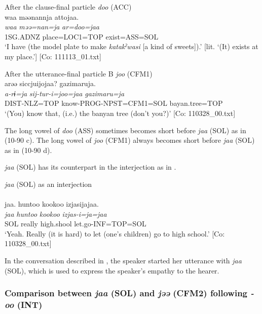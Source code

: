\begin{xlist}
  \ex After the clause-final particle \textit{doo} (ACC)\\
      \glll    waa  məənannja  attojaa.\\
    \textit{waa}  \textit{məə=nan=ja}  \textit{ar=doo=jaa}\\
    1SG.ADNZ  place=LOC1=TOP  exist=ASS=SOL\\
    \glt     ‘I have (the model plate to make \textit{katakˀwasi} [a kind of sweets]).’ [lit. ‘(It) exists at my place.’]  [Co: 111113\_01.txt]

   \ex After the utterance-final particle B \textit{joo} (CFM1)\\
      \glll    arəə  siccjuijojaa?  gazimaruja.\\
    \textit{a-rɨ=ja}  \textit{sij-tur-i=joo=jaa}  \textit{gazimaru=ja}\\
    DIST-NLZ=TOP  know-PROG-NPST=CFM1=SOL  bayan.tree=TOP\\
 \glt     ‘(You) know that, (i.e.) the banyan tree (don’t you?)’  [Co: 110328\_00.txt]
 \z
\z

The long vowel of \textit{doo} (ASS) sometimes becomes short before \textit{jaa} (SOL) as in (10-90 c). The long vowel of \textit{joo} (CFM1) always becomes short before \textit{jaa} (SOL) as in (10-90 d).

  \textit{jaa} (SOL) has its counterpart in the interjection as in .

\ea\label{ex:10.91}   \textit{jaa} (SOL) as an interjection\\\\
      \glll    jaa.  huntoo  {\textbar}kookoo{\textbar}  izjasijajaa.\\
    \textit{jaa}  \textit{huntoo}  \textit{kookoo}  \textit{izjas-i=ja=jaa}\\
    SOL  really  high.shool  let.go-INF=TOP=SOL\\
\glt     ‘Yeah. Really (it is hard) to let (one’s children) go to high school.’  [Co: 110328\_00.txt]
\z

In the conversation described in , the speaker started her utterance with \textit{jaa} (SOL), which is used to express the speaker’s empathy to the hearer.

\subsubsection{Comparison between \textit{jaa} (SOL) and \textit{jəə} (CFM2) following \textit{{}-oo} (INT)}\label{sec:10.5.2.2}


\end{xlist}
